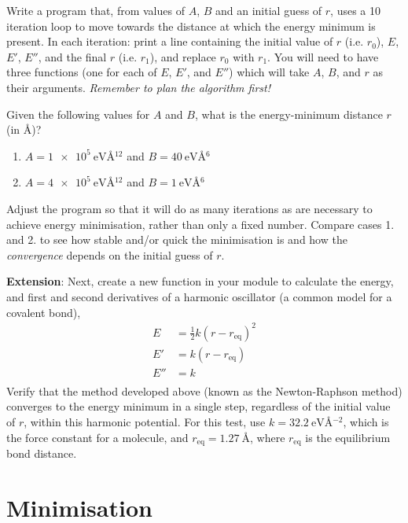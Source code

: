 \documentclass[a4paper]{article}
\begin{document}
Write a program that, from values of $A$, $B$ and an initial guess of $r$, uses a 10 iteration loop to move towards the distance at which the energy minimum is present.
In each iteration: print a line containing the initial value of $r$ (i.e. $r_0$), $E$, $E'$, $E''$, and the final $r$ (i.e. $r_1$), and replace $r_0$ with $r_1$.
You will need to have three functions (one for each of $E$, $E'$, and $E''$) which will take $A$, $B$, and $r$ as their arguments.
\emph{Remember to plan the algorithm first!}

Given the following values for $A$ and $B$, what is the energy-minimum distance $r$ (in \AA)?
\begin{enumerate}
  \item{$A = \SI{1e5}{\eV\angstrom^{12}}$ and $B = \SI{40}{\eV\angstrom^{6}}$}
  \item{$A = \SI{4e5}{\eV\angstrom^{12}}$ and $B = \SI{1}{\eV\angstrom^{6}}$}
\end{enumerate}
Adjust the program so that it will do as many iterations as are necessary to achieve energy minimisation, rather than only a fixed number.
Compare cases 1. and 2. to see how stable and/or quick the minimisation is and how the \emph{convergence} depends on the initial guess of $r$.

\textbf{Extension}: Next, create a new function in your module to calculate the energy, and first and second derivatives of a harmonic oscillator (a common model for a covalent bond),
\begin{equation}
  \begin{aligned}
    E & = \frac{1}{2}k(r-r_{\text{eq}})^2 \\
    E' & = k(r-r_{\text{eq}}) \\
    E'' & = k \\
  \end{aligned}
\end{equation}
Verify that the method developed above (known as the Newton-Raphson method) converges to the energy minimum in a single step, regardless of the initial value of $r$, within this harmonic potential.
For this test, use $k = \SI{32.2}{\eV\angstrom^{-2}}$, which is the force constant for a  molecule, and $r_{\text{eq}}=\SI{1.27}{\angstrom}$, where $r_{\text{eq}}$ is the equilibrium bond distance.

\section{Minimisation}
\end{document}
